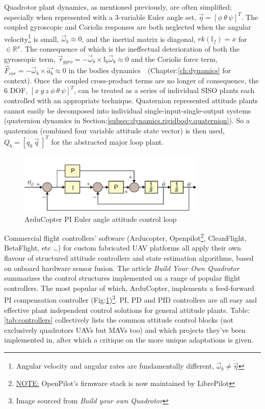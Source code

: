 \par
Quadrotor plant dynamics, as mentioned previously, are often simplified; especially when represented with a 3-variable Euler angle set, $\vec{\eta} = [\phi ~\theta ~\psi]^T$. The coupled gyroscopic and Coriolis responses are both neglected when the angular velocity\footnote{Angular velocity and angular rates are fundamentally different, $\vec{\omega}_b\not=\dot{\vec{\eta}}$} is small, $\vec{\omega}_b \approx 0$, and the inertial matrix is diagonal, $rk(\mathbb{I}_f)= x$ for $\in\mathbb{R}^x$. The consequence of which is the ineffectual deterioration of both the gyroscopic term, $\vec{\tau}_{gyro}=-\vec{\omega}_b \times \mathbb{I}_b\vec{\omega}_b \approx 0$ and the  Coriolis force term, $\vec{F}_{cor}=-\vec{\omega}_b \times \vec{a_b} \approx 0$ in the bodies dynamics~~(Chapter:\ref{ch:dynamics} for context). Once the coupled cross-product terms are no longer of consequence, the 6 DOF, $[x ~y ~z ~\phi ~\theta ~\psi]^T$, can be treated as a series of individual SISO plants each controlled with an appropriate technique. Quaternion represented attitude plants cannot easily be decomposed into individual single-input-single-output systems (quaternion dynamics in Section:\ref{subsec:dynamics.rigidbody.quaternion}). So a quaternion (combined four variable attitude state vector) is then used, $Q_b = [q_0 ~\vec{q}\>]^T$ for the abstracted major loop plant.
\par
\begin{figure}[hbtp]
\centering
\includegraphics[width=0.8\textwidth]{figs/arducopter-pi}
\caption{ArduCopter PI Euler angle attitude control loop}
\label{fig:arducopter-pi}
\end{figure}
Commercial flight controllers' software (Arducopter\cite{arducoptersite}, Openpilot\cite{openpilotsite}\footnote{\underline{NOTE:} OpenPilot's firmware stack is now maintained by LibrePilot}, CleanFlight\cite{cleanflight}, BetaFlight\cite{betaflight}, etc \ldots) for custom fabricated UAV platforms all apply their own flavour of structured attitude controllers and state estimation algorithms, based on onboard hardware sensor fusion. The article \emph{Build Your Own Quadrotor}\cite{buildyourownquad} summarizes the control structures implemented on a range of popular flight controllers. The most popular of which, ArduCopter, implements a feed-forward PI compensation controller (Fig:\ref{fig:arducopter-pi})\footnote{Image sourced from \emph{Build your own Quadrotor}\cite{buildyourownquad}}.  PI, PD and PID controllers are all easy and effective plant independent control solutions for general attitude plants. Table:\ref{tab:controllers} collectively lists the common attitude control blocks (not exclusively quadrotors UAVs but MAVs too) and which projects they've been implemented in, after which a critique on the more unique adaptations is given.
